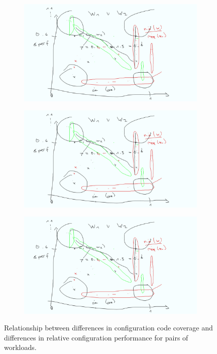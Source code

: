 \begin{figure}
\begin{subfigure}{0.33\textwidth}
		\caption{\htwo}
	\end{subfigure}
	\begin{subfigure}{0.33\textwidth}
		\centering
		\includegraphics[width=\linewidth]{images/mockup.png}
		\caption{\jumper}
	\end{subfigure}
	\begin{subfigure}{0.33\textwidth}
		\centering
		\includegraphics[width=\linewidth]{images/mockup.png}
		\caption{\jadx}
	\end{subfigure}
	\begin{subfigure}{0.33\textwidth}
		\centering
		\includegraphics[width=\linewidth]{images/mockup.png}
		\caption{\kanzi}
	\end{subfigure}
	\caption{Relationship between differences in configuration code coverage and differences in relative configuration performance for pairs of workloads.}
	\label{fig:diff_config}
\end{figure}


